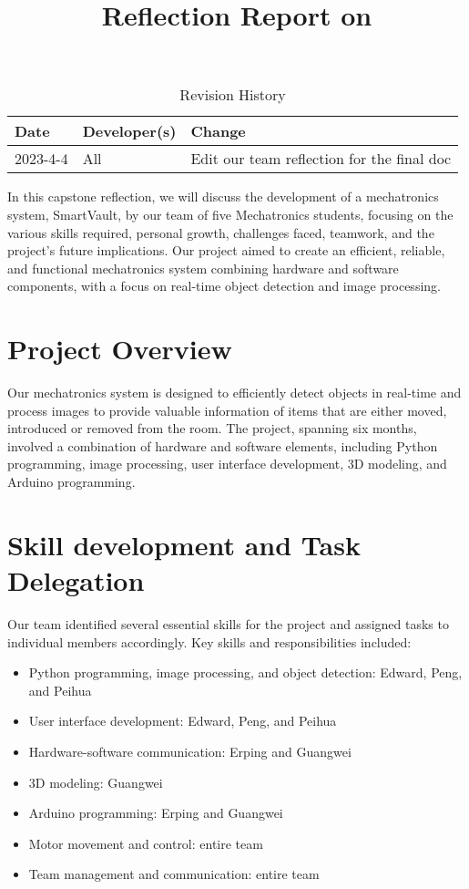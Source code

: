 \documentclass{article}
\title{Reflection Report on \progname}
\author{\authname}
\date{}
\begin{document}
\begin{table}[hp]
\caption{Revision History} \label{TblRevisionHistory}
\begin{tabularx}{\textwidth}{llX}
\toprule
\textbf{Date} & \textbf{Developer(s)} & \textbf{Change}\\
\midrule
2023-4-4 & All & Edit our team reflection for the final doc\\
\bottomrule
\end{tabularx}
\end{table}

\newpage

\maketitle

In this capstone reflection, we will discuss the development of a mechatronics system, SmartVault,  by our team of five Mechatronics students, focusing on the various skills required, personal growth, challenges faced, teamwork, and the project's future implications. Our project aimed to create an efficient, reliable, and functional mechatronics system combining hardware and software components, with a focus on real-time object detection and image processing.

\section{Project Overview}
Our mechatronics system is designed to efficiently detect objects in real-time and process images to provide valuable information of items that are either moved, introduced or removed from the room. The project, spanning six months, involved a combination of hardware and software elements, including Python programming, image processing, user interface development, 3D modeling, and Arduino programming.
\section{Skill development and Task Delegation}
Our team identified several essential skills for the project and assigned tasks to individual members accordingly. Key skills and responsibilities included:
\begin{itemize}
    \item Python programming, image processing, and object detection: Edward, Peng, and Peihua
    \item User interface development: Edward, Peng, and Peihua
    \item Hardware-software communication: Erping and Guangwei
    \item 3D modeling: Guangwei
    \item Arduino programming: Erping and Guangwei
    \item Motor movement and control: entire team
    \item Team management and communication: entire team
\end{itemize}
\end{document}
